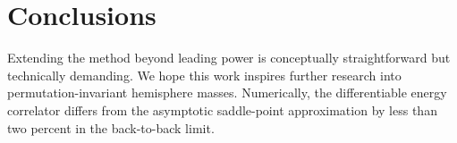 \section{Conclusions}\label{sec:conclusions}

Extending the method beyond leading power is conceptually
straightforward but technically demanding. We hope this work inspires
further research into permutation-invariant hemisphere masses.
Numerically, the differentiable energy correlator differs from the
asymptotic saddle-point approximation by less than two percent in the
back-to-back limit.

